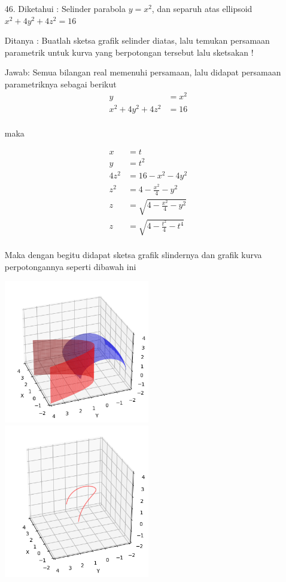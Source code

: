 \documentclass[twoside]{scrarticle}
\begin{document}
\begin{enumerate}
		\item[46.] Diketahui : Selinder parabola $y=x^2$, dan separuh atas ellipsoid $x^2+4 y^2+4 z^2=16$
		
		Ditanya : Buatlah sketsa grafik selinder diatas, lalu temukan persamaan parametrik untuk kurva yang berpotongan tersebut lalu sketsakan !
		
		Jawab: Semua bilangan real memenuhi persamaan, lalu didapat persamaan parametriknya sebagai berikut
		\begin{equation*}
			\begin{aligned}
				y & = x^2\\
				x^2 + 4 y^2 + 4 z^2 & = 16\\
			\end{aligned}
		\end{equation*}
		\centerline{maka}
		\begin{equation*}
			\begin{aligned}
				x & = t\\
				y & = t^2\\
				4z^2 & = 16 - x^2 - 4y^2\\
				z^2 & = 4 - \frac{x^2}{4} - y^2\\
				z & = \sqrt{4 - \frac{x^2}{4} - y^2}\\
				z & = \sqrt{4 - \frac{t^2}{4} - t^4}\\
			\end{aligned}
		\end{equation*}
		
		Maka dengan begitu didapat sketsa grafik slindernya dan grafik kurva perpotongannya seperti dibawah ini
		
		\begin{minipage}{\linewidth}
			\includegraphics[width=0.5\textwidth]{46.png}
			\includegraphics[width=0.5\textwidth]{46_1.png}
		\end{minipage}
		

\end{enumerate}
\end{document}
